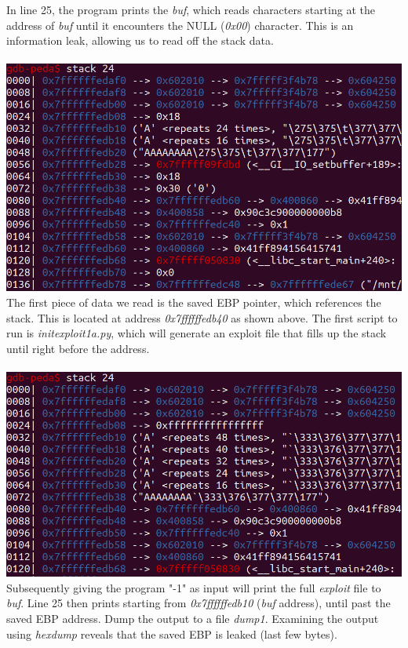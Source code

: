 \documentclass[12pt]{article}
\begin{document}
In line 25, the program prints the \emph{buf}, which reads characters starting at the address of \emph{buf} until it encounters the NULL (\emph{0x00}) character. This is an information leak, allowing us to read off the stack data.\\\\

\includegraphics[scale=0.7]{./a2/rop/stack24.PNG}\\

The first piece of data we read is the saved EBP pointer, which references the stack.
This is located at address \emph{0x7ffffffedb40} as shown above.
The first script to run is \emph{initexploit1a.py}, which will generate an exploit file that fills up the stack until right before the address.\\\\

\includegraphics[scale=0.7]{./a2/rop/stack24_ebp.PNG}\\

Subsequently giving the program "-1" as input will print the full \emph{exploit} file to \emph{buf}.
Line 25 then prints starting from \emph{0x7ffffffedb10} (\emph{buf} address), until past the saved EBP address.
Dump the output to a file \emph{dump1}.
Examining the output using \emph{hexdump} reveals that the saved EBP is leaked (last few bytes).\\\\
\end{document}
